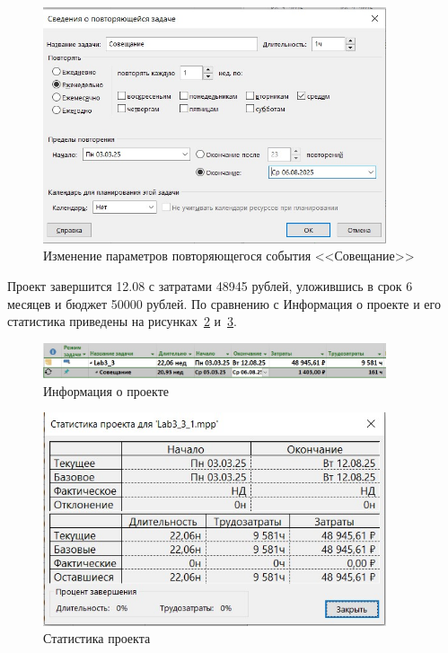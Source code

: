 \begin{figure}[H]
	\centering
	\includegraphics[width=0.9\textwidth]{img/lab3/task3/screen3.jpg}
	\caption{Изменение параметров повторяющегося события <<Совещание>>}
	\label{fig:screen3_3}
\end{figure}

Проект завершится 12.08 с затратами 48945 рублей, уложившись в срок 6 месяцев и бюджет 50000 рублей.
По сравнению с 
Информация о проекте и его статистика приведены на рисунках~\ref{fig:screen3_4} и~\ref{fig:screen3_9}.

\begin{figure}[H]
	\centering
	\includegraphics[width=0.9\textwidth]{img/lab3/task3/screen4.jpg}
	\caption{Информация о проекте}
	\label{fig:screen3_4}
\end{figure}

\begin{figure}[H]
	\centering
	\includegraphics[width=0.9\textwidth]{img/lab3/task3/screen9.jpg}
	\caption{Статистика проекта}
	\label{fig:screen3_9}
\end{figure}

